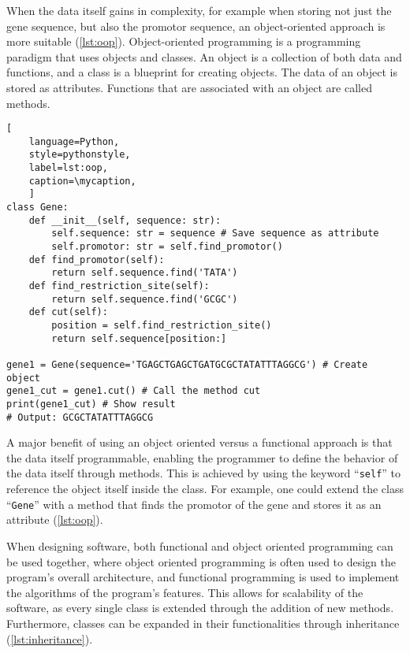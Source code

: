 When the data itself gains in complexity, for example when storing not just the
gene sequence, but also the promotor sequence, an object-oriented approach is
more suitable (\autoref{lst:oop}). Object-oriented programming is a programming
paradigm that uses objects and classes. An object is a collection of both data
and functions, and a class is a blueprint for creating objects. The data of an
object is stored as attributes. Functions that are associated with an object are
called methods.

\def\mycaption{ Example of object oriented programming in python. The class is
    called ``\texttt{Gene}'' and has four methods, ``\texttt{\_\_init\_\_}'',
    ``\texttt{find\_promotor}'', ``\texttt{find\_restriction\_site}'' and
    ``\texttt{cut}''. The function ``\texttt{\_\_init\_\_}'' is called when
    creating (``initializing'') an object, which fills the object with
    user-defined data. The parameter ``\texttt{self}'' is used to reference the
    object itself internally. ``\texttt{find\_promotor}'' is a
    method that finds the position of the promotor in the gene and is called
    during object initialization. }
\begin{lstlisting}[
    language=Python,
    style=pythonstyle,
    label=lst:oop,
    caption=\mycaption,
    ]
class Gene:
    def __init__(self, sequence: str):
        self.sequence: str = sequence # Save sequence as attribute
        self.promotor: str = self.find_promotor() 
    def find_promotor(self):
        return self.sequence.find('TATA')
    def find_restriction_site(self):
        return self.sequence.find('GCGC')
    def cut(self):
        position = self.find_restriction_site()
        return self.sequence[position:]

gene1 = Gene(sequence='TGAGCTGAGCTGATGCGCTATATTTAGGCG') # Create object
gene1_cut = gene1.cut() # Call the method cut
print(gene1_cut) # Show result
# Output: GCGCTATATTTAGGCG
\end{lstlisting}

A major benefit of using an object oriented versus a functional approach is that
the data itself programmable, enabling the programmer to define the behavior of
the data itself through methods. This is achieved by using the keyword
``\texttt{self}'' to reference the object itself inside the class. For example,
one could extend the class ``\texttt{Gene}'' with a method that finds the
promotor of the gene and stores it as an attribute (\autoref{lst:oop}).

When designing software, both functional and object oriented programming can be
used together, where object oriented programming is often used to design the
program's overall architecture, and functional programming is used to implement
the algorithms of the program's features. This allows for scalability of the
software, as every single class is extended through the addition of new methods.
Furthermore, classes can be expanded in their functionalities through
inheritance (\autoref{lst:inheritance}).


